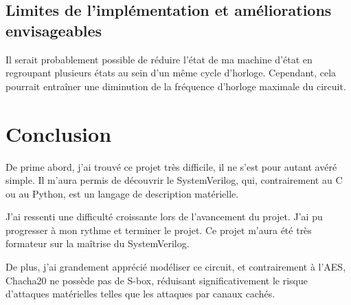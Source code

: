 \documentclass[12pt, a4paper]{article}
\begin{document}
\subsection{Limites de l'implémentation et améliorations envisageables}

Il serait probablement possible de réduire l'état de ma machine d’état en regroupant plusieurs états au sein d’un même cycle d’horloge. Cependant, cela pourrait entraîner une diminution de la fréquence d’horloge maximale du circuit. 


\section{Conclusion}

De prime abord, j’ai trouvé ce projet très difficile, il ne s’est pour autant avéré simple.
Il m'aura permis de découvrir le SystemVerilog, qui, contrairement au C ou au Python, est un langage de description matérielle.


J’ai ressenti une difficulté croissante lors de l’avancement du projet. J’ai pu progresser à mon rythme et terminer le projet. Ce projet m’aura été très formateur sur la maîtrise du SystemVerilog.

De plus, j'ai grandement apprécié modéliser ce circuit, et contrairement à l'AES, Chacha20 ne possède pas de S-box, réduisant significativement le risque d'attaques matérielles telles que les attaques par canaux cachés. 
\end{document}
